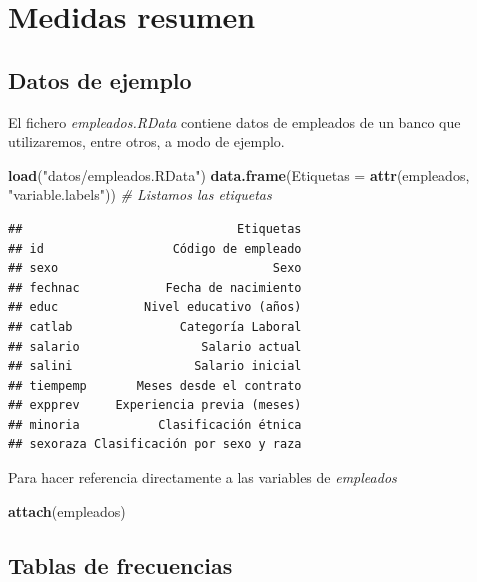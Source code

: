\documentclass[]{book}
\newenvironment{Shaded}{\begin{snugshade}}{\end{snugshade}}
\newcommand{\CommentTok}[1]{\textcolor[rgb]{0.56,0.35,0.01}{\textit{#1}}}
\newcommand{\DataTypeTok}[1]{\textcolor[rgb]{0.13,0.29,0.53}{#1}}
\newcommand{\KeywordTok}[1]{\textcolor[rgb]{0.13,0.29,0.53}{\textbf{#1}}}
\newcommand{\NormalTok}[1]{#1}
\newcommand{\StringTok}[1]{\textcolor[rgb]{0.31,0.60,0.02}{#1}}
\begin{document}
\hypertarget{medidas-resumen}{%
\section{Medidas resumen}\label{medidas-resumen}}

\hypertarget{datos-de-ejemplo}{%
\subsection{Datos de ejemplo}\label{datos-de-ejemplo}}

El fichero \emph{empleados.RData} contiene datos de empleados de un banco que utilizaremos,
entre otros, a modo de ejemplo.

\begin{Shaded}
\begin{Highlighting}[]
\KeywordTok{load}\NormalTok{(}\StringTok{"datos/empleados.RData"}\NormalTok{)}
\KeywordTok{data.frame}\NormalTok{(}\DataTypeTok{Etiquetas =} \KeywordTok{attr}\NormalTok{(empleados, }\StringTok{"variable.labels"}\NormalTok{))  }\CommentTok{# Listamos las etiquetas}
\end{Highlighting}
\end{Shaded}

\begin{verbatim}
##                              Etiquetas
## id                  Código de empleado
## sexo                              Sexo
## fechnac            Fecha de nacimiento
## educ            Nivel educativo (años)
## catlab               Categoría Laboral
## salario                 Salario actual
## salini                 Salario inicial
## tiempemp       Meses desde el contrato
## expprev     Experiencia previa (meses)
## minoria           Clasificación étnica
## sexoraza Clasificación por sexo y raza
\end{verbatim}

Para hacer referencia directamente a las variables de \emph{empleados}

\begin{Shaded}
\begin{Highlighting}[]
\KeywordTok{attach}\NormalTok{(empleados)}
\end{Highlighting}
\end{Shaded}

\hypertarget{tablas-de-frecuencias}{%
\subsection{Tablas de frecuencias}\label{tablas-de-frecuencias}}
\end{document}
